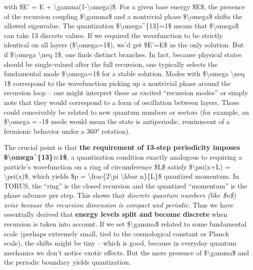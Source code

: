 \documentclass[
]{article}
\begin{document}
with \$E' = E +
\textbackslash gamma(1-\textbackslash omega)\$\hspace{0pt}. For a given
base energy \$E\$, the presence of the recursion coupling
\$\textbackslash gamma\$ and a nontrivial phase \$\textbackslash omega\$
shifts the allowed eigenvalue. The quantization
\$\textbackslash omega\^{}\{13\}=1\$ means that \$\textbackslash omega\$
can take 13 discrete values. If we required the wavefunction to be
strictly identical on all layers (\$\textbackslash omega=1\$), we'd get
\$E'=E\$ as the only solution. But if \$\textbackslash omega
\textbackslash neq 1\$, one finds distinct branches. In fact, because
physical states should be single-valued after the full recursion, one
typically selects the fundamental mode \$\textbackslash omega=1\$ for a
stable solution\hspace{0pt}. Modes with \$\textbackslash omega
\textbackslash neq 1\$ correspond to the wavefunction picking up a
nontrivial phase around the recursion loop -- one might interpret these
as excited ``recursion modes'' or simply note that they would correspond
to a form of oscillation between layers\hspace{0pt}. Those could
conceivably be related to new quantum numbers or sectors (for example,
an \$\textbackslash omega = -1\$ mode would mean the state is
antiperiodic, reminiscent of a fermionic behavior under a 360°
rotation).

The crucial point is that \textbf{the requirement of 13-step periodicity
imposes \$\textbackslash omega\^{}\{13\}=1\$}, a quantization condition
exactly analogous to requiring a particle's wavefunction on a ring of
circumference \$L\$ satisfy \$\textbackslash psi(x+L) =
\textbackslash psi(x)\$, which yields \$p =
\textbackslash frac\{2\textbackslash pi \textbackslash hbar n\}\{L\}\$
quantized momentum\hspace{0pt}. In TORUS, the ``ring'' is the closed
recursion and the quantized ``momentum'' is the phase advance per step.
This shows that \emph{discrete quantum numbers (like \$n\$) arise
because the recursion dimension is compact and periodic}. Thus we have
essentially derived that \textbf{energy levels split and become
discrete} when recursion is taken into account\hspace{0pt}. If we set
\$\textbackslash gamma\$ related to some fundamental scale (perhaps
extremely small, tied to the cosmological constant or Planck scale), the
shifts might be tiny -- which is good, because in everyday quantum
mechanics we don't notice exotic effects. But the mere presence of
\$\textbackslash gamma\$ and the periodic boundary yields quantization.
\end{document}
